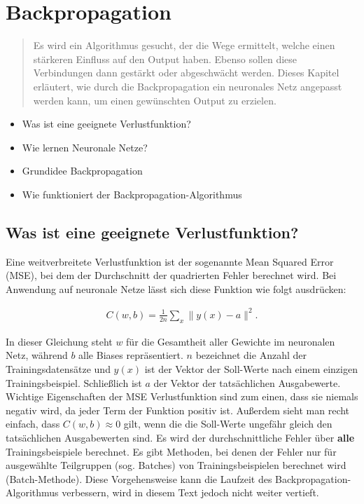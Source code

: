 
\thispagestyle{empty}
\section{Backpropagation}\label{sec:backpropagation}   

\vspace{1cm}
\begin{tcolorbox}[title={Inhalte der \textit{Backpropagation}}]
  \begin{quotation}\noindent
    Es wird ein Algorithmus gesucht, der die Wege ermittelt, welche einen stärkeren Einfluss auf den Output haben. Ebenso sollen diese Verbindungen dann gestärkt oder abgeschwächt werden.
    Dieses Kapitel erläutert, wie durch die Backpropagation ein neuronales Netz angepasst werden kann, um einen gewünschten Output zu erzielen. 
  \end{quotation}
  \begin{itemize}
    \item Was ist eine geeignete Verlustfunktion?
    \item Wie lernen Neuronale Netze?
    \item Grundidee Backpropagation
    \item Wie funktioniert der Backpropagation-Algorithmus
  \end{itemize}
\end{tcolorbox}

\subsection{Was ist eine geeignete Verlustfunktion?}\label{subsec:backpropagation:verlustfunktion}
Eine weitverbreitete Verlustfunktion ist der sogenannte Mean Squared Error (MSE), bei dem der Durchschnitt der quadrierten Fehler berechnet wird.
Bei Anwendung auf neuronale Netze lässt sich diese Funktion wie folgt ausdrücken:

\begin{eqnarray}  
  C(w,b) = \frac{1}{2n} \sum_x \| y(x) - a\|^2.
\end{eqnarray}

\noindent
In dieser Gleichung steht $w$ für die Gesamtheit aller Gewichte im neuronalen Netz, während $b$ alle Biases repräsentiert.
$n$ bezeichnet die Anzahl der Trainingsdatensätze und $y(x)$ ist der Vektor der Soll-Werte nach einem einzigen Trainingsbeispiel.
Schließlich ist $a$ der Vektor der tatsächlichen Ausgabewerte. 
\bigbreak\noindent
Wichtige Eigenschaften der MSE Verlustfunktion sind zum einen, dass sie niemals negativ wird, da jeder Term der Funktion positiv ist.
Außerdem sieht man recht einfach, dass $C(w, b) \approx 0$ gilt, wenn die die Soll-Werte ungefähr gleich den tatsächlichen Ausgabewerten sind.
\bigbreak\noindent
Es wird der durchschnittliche Fehler über \textbf{alle} Trainingsbeispiele berechnet. 
Es gibt Methoden, bei denen der Fehler nur für ausgewählte Teilgruppen (sog. Batches) von Trainingsbeispielen berechnet wird (Batch-Methode). 
Diese Vorgehensweise kann die Laufzeit des Backpropagation-Algorithmus verbessern, wird in diesem Text jedoch nicht weiter vertieft.

